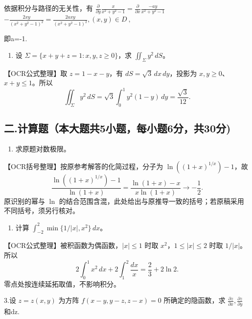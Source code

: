 \documentclass[11pt,fontset=fandol]{ctexart}
\providecommand{\tightlist}{\setlength{\itemsep}{0pt}\setlength{\parskip}{0pt}}
\begin{document}
依据积分与路径的无关性，有
\(\frac { \partial } { \partial y } \frac { x } { x ^ { 2 } + y ^ { 2 } - 1 } = \frac { \partial } { \partial x } \frac { - a y } { x ^ { 2 } + y ^ { 2 } - 1 }\)
\(- \frac { 2 x y } { \left( x ^ { 2 } + y ^ { 2 } - 1 \right) ^ { 2 } } { = } \frac { 2 a x y } { \left( x ^ { 2 } + y ^ { 2 } - 1 \right) ^ { 2 } } , ( x , y ) \in D \mathrm { ~ , ~ }\)

即a=-1.

\begin{enumerate}
\def\labelenumi{\arabic{enumi}.}
\setcounter{enumi}{7}
\tightlist
\item
  设 \(\Sigma=\{x+y+z=1:x,y,z\ge0\}\)，求 \(\iint_\Sigma y^2\,dS\)。
\end{enumerate}

【OCR公式整理】取 \(z=1-x-y\)，有 \(dS=\sqrt3\,dx\,dy\)，投影为
\(x,y\ge0\)、\(x+y\le1\)。所以 \[
\iint_\Sigma y^2\,dS=\sqrt3\int_0^1y^2(1-y)\,dy=\frac{\sqrt3}{12}.
\]

\subsection{二.计算题（本大题共5小题，每小题6分，共30分)}\label{ux4e8c.ux8ba1ux7b97ux9898ux672cux5927ux9898ux51715ux5c0fux9898ux6bcfux5c0fux98986ux5206ux517130ux5206}

\begin{enumerate}
\def\labelenumi{\arabic{enumi}.}
\tightlist
\item
  求原题对数极限。
\end{enumerate}

【OCR括号整理】按原参考解答的化简过程，分子为 \(\ln((1+x)^{1/x})-1\)，故
\[
\frac{\ln((1+x)^{1/x})-1}{\ln(1+x)}
=\frac{\ln(1+x)-x}{x\ln(1+x)}
\longrightarrow-\frac12.
\] 原识别的幂与 \(\ln\)
的结合范围含混，此处给出与原推导一致的括号；若原稿采用不同括号，须另行核对。

\begin{enumerate}
\def\labelenumi{\arabic{enumi}.}
\setcounter{enumi}{1}
\tightlist
\item
  计算 \(\int_{-2}^2\min\{1/|x|,x^2\}\,dx\)。
\end{enumerate}

【OCR公式整理】被积函数为偶函数，\(|x|\le1\) 时取
\(x^2\)，\(1\le|x|\le2\) 时取 \(1/|x|\)。所以 \[
2\int_0^1x^2\,dx+2\int_1^2\frac{dx}{x}=\frac23+2\ln2.
\] 零点处按连续延拓取值，不影响积分。

3.设 \(z = z ( x , y )\) 为方阵 \(f ( x - y , y - z , z - x ) = 0\)
所确定的隐函数，求
\(\frac { \partial z } { \partial x } , \frac { \partial z } { \partial y }\)
和dz.
\end{document}
